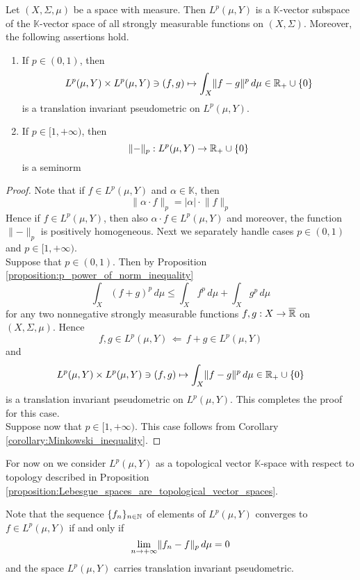 \begin{proposition}\label{proposition:Lebesgue_spaces_are_topological_vector_spaces}
    Let $(X,\Sigma,\mu)$ be a space with measure. Then $L^p(\mu,Y)$ is a $\mathbb{K}$-vector subspace of the $\mathbb{K}$-vector space of all strongly measurable functions on $(X,\Sigma)$. Moreover, the following assertions hold.
    \begin{enumerate}[label=\emph{\textbf{(\arabic*)}}, leftmargin=*]
        \item If $p \in (0,1)$, then
              $$L^p(\mu,Y)\times L^p(\mu,Y) \ni (f,g) \mapsto \int_X\lVert f - g\rVert^p\,d\mu \in {\mathbb R}_+\cup \{0\}$$
              is a translation invariant pseudometric on $L^p(\mu,Y)$.
        \item If $p \in [1,+\infty)$, then
              $$\lVert-\rVert_p:L^p(\mu,Y)\rightarrow {\mathbb R}_+\cup \{0\}$$
              is a seminorm
    \end{enumerate}
\end{proposition}
\begin{proof}
    Note that if $f\in L^p(\mu,Y)$ and $\alpha \in \mathbb{K}$, then
    $$\lVert \alpha \cdot f\rVert_p = |\alpha|\cdot \lVert f\rVert_p$$
    Hence if $f\in L^p(\mu,Y)$, then also $\alpha \cdot f \in L^p(\mu,Y)$ and moreover, the function $\lVert -\rVert_p$ is positively homogeneous. Next we separately handle cases $p \in (0,1)$ and $p \in [1,+\infty)$.\\
    Suppose that $p \in (0,1)$. Then by Proposition \ref{proposition:p_power_of_norm_inequality}
    $$\int_X\left(f + g\right)^p\,d\mu \leq \int_X f^p\,d\mu + \int_X g^p\,d\mu$$
    for any two nonnegative strongly measurable functions $f,g:X\rightarrow \overline{{\mathbb R}}$ on $(X,\Sigma,\mu)$. Hence
    $$f,g\in L^p(\mu,Y)\,\Leftarrow\,f+g\in L^p(\mu,Y)$$
    and
    $$L^p(\mu,Y)\times L^p(\mu,Y) \ni (f,g) \mapsto \int_X\lVert f - g\rVert^p\,d\mu \in {\mathbb R}_+\cup \{0\}$$
    is a translation invariant pseudometric on $L^p(\mu,Y)$. This completes the proof for this case.\\
    Suppose now that $p\in [1,+\infty)$. This case follows from Corollary \ref{corollary:Minkowski_inequality}.
\end{proof}
\noindent
For now on we consider $L^p(\mu,Y)$ as a topological vector $\mathbb{K}$-space with respect to topology described in Proposition \ref{proposition:Lebesgue_spaces_are_topological_vector_spaces}.

\begin{remark}\label{remark:topology_of_Lebesgue_spaces_is_sequential}
    Note that the sequence $\{f_n\}_{n\in {\mathbb N}}$ of elements of $L^p(\mu,Y)$ converges to $f\in L^p(\mu,Y)$ if and only if
    $$\lim_{n\rightarrow +\infty}\lVert f_n - f\rVert_p\,d\mu = 0$$
    and the space $L^p(\mu,Y)$ carries translation invariant pseudometric.
\end{remark}

